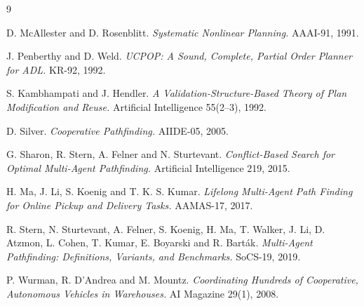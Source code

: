 \documentclass[10pt,a4paper]{article}
\begin{document}
\begin{thebibliography}{9}

 D. McAllester and D. Rosenblitt.
  \emph{Systematic Nonlinear Planning.}  AAAI-91, 1991.

 J. Penberthy and D. Weld.
  \emph{UCPOP: A Sound, Complete, Partial Order Planner for ADL.}
  KR-92, 1992.

 S. Kambhampati and J. Hendler.
  \emph{A Validation-Structure-Based Theory of Plan Modification and Reuse.}
  Artificial Intelligence 55(2--3), 1992.

 D. Silver.
  \emph{Cooperative Pathfinding.}  AIIDE-05, 2005.

 G. Sharon, R. Stern, A. Felner and N. Sturtevant.
  \emph{Conflict-Based Search for Optimal Multi-Agent Pathfinding.}
  Artificial Intelligence 219, 2015.

 H. Ma, J. Li, S. Koenig and T. K. S. Kumar.
  \emph{Lifelong Multi-Agent Path Finding for Online Pickup and Delivery
  Tasks.}  AAMAS-17, 2017.

 R. Stern, N. Sturtevant, A. Felner, S. Koenig, H. Ma,
  T. Walker, J. Li, D. Atzmon, L. Cohen, T. Kumar, E. Boyarski and R. Bart\'ak.
  \emph{Multi-Agent Pathfinding: Definitions, Variants, and Benchmarks.}
  SoCS-19, 2019.

 P. Wurman, R. D'Andrea and M. Mountz.
  \emph{Coordinating Hundreds of Cooperative, Autonomous Vehicles in
  Warehouses.}  AI Magazine 29(1), 2008.

\end{thebibliography}
\end{document}
